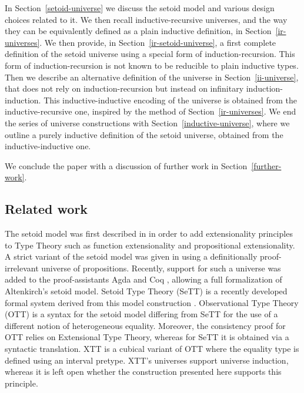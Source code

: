\documentclass{easychair}
\begin{document}
In Section~\ref{setoid-universe} we discuss the setoid model and various design
choices related to it. We then recall inductive-recursive universes, and the way
they can be equivalently defined as a plain inductive definition, in
Section~\ref{ir-universes}.
%
We then provide, in Section~\ref{ir-setoid-universe}, a first complete
definition of the setoid universe using a special form of induction-recursion.
This form of induction-recursion is not known to be reducible to plain inductive types.
Then we describe an alternative definition of the universe in
Section~\ref{ii-universe}, that does not rely on induction-recursion but instead
on infinitary induction-induction. This inductive-inductive encoding of the
universe is obtained from the inductive-recursive one, inspired by the method of
Section~\ref{ir-universes}.
%
We end the series of universe constructions with
Section~\ref{inductive-universe}, where we outline a purely inductive definition
of the setoid universe, obtained from the inductive-inductive one.

We conclude the paper with a discussion of further work in
Section~\ref{further-work}.

\subsection{Related work}

The setoid model was first described in \cite{hofmann} in order to add
extensionality principles to Type Theory such as function extensionality and
propositional extensionality. A strict variant of the setoid model was given in
\cite{setoid99} using a definitionally proof-irrelevant universe of
propositions. Recently, support for such a universe was added to the
proof-assistants Agda and Coq \cite{agda-prop}, allowing a full formalization of
Altenkirch's setoid model. Setoid Type Theory (SeTT) is a recently developed
formal system derived from this model construction \cite{mpc19}. Observational
Type Theory (OTT) \cite{alti:ott-conf, alti:ott-conf} is a syntax for the setoid
model differing from SeTT for the use of a different notion of heterogeneous
equality. Moreover, the consistency proof for OTT relies on Extensional Type
Theory, whereas for SeTT it is obtained via a syntactic translation.
%
XTT \cite{xtt} is a cubical variant of OTT where the equality type is defined
using an interval pretype. XTT's universes support universe induction, whereas
it is left open whether the construction presented here supports this principle.
\end{document}
